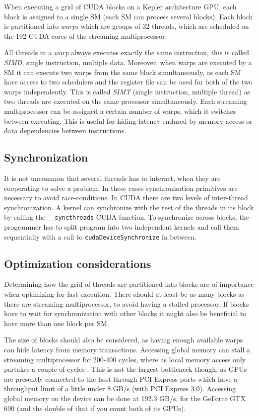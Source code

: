 When executing a grid of CUDA blocks on a Kepler architecture GPU,
each block is assigned to a single SM (each SM can process several
blocks). Each block is partitioned into \textit{warps} which are
groups of 32 threads, which are scheduled on the 192 CUDA cores of the
streaming multiprocessor. %

All threads in a \textit{warp} always executes exactly the same
instruction, this is called \textit{SIMD}, single instruction,
multiple data. Moreover, when warps are executed by a SM it can
execute two warps from the same block simultaneously, as each SM have
access to two schedulers and the register file can be used for both of
the two warps independently. This is called \textit{SIMT} (single
instruction, multiple thread) as two threads are executed on the same
processor simultaneously. Each streaming multiprocessor can be
assigned a certain number of warps, which it switches between
executing. This is useful for hiding latency endured by memory access
or data dependencies between instructions.

\subsection{Synchronization}
It is not uncommon that several threads has to interact, when they are
cooperating to solve a problem. In these cases synchronization
primitives are necessary to avoid race-conditions. In CUDA there are
two levels of inter-thread synchronization. A kernel can synchronize
with the rest of the threads in its block by calling the
\lstinline{__syncthreads} CUDA function. To synchronize across blocks,
the programmer has to split program into two independent kernels and
call them sequentially with a call to \lstinline{cudaDeviceSynchronize}
in between.

\subsection{Optimization considerations}
Determining how the grid of threads are partitioned into blocks are of
importance when optimizing for fast execution. There should at least
be as many blocks as there are streaming multiprocessor, to avoid
having a stalled processor. If blocks have to wait for synchronization
with other blocks it might also be beneficial to have more than one
block per SM.

The size of blocks should also be considered, as having enough
available warps can hide latency from memory transactions. Accessing
global memory can stall a streaming multiprocessor for 200-400 cycles,
where as local memory access only partakes a couple of cycles
\cite{nvidia2012cudaguide}. This is not the largest bottleneck though,
as GPUs are presently connected to the host through PCI Express ports
which have a throughput limit of a little under 8 GB/s (with PCI
Express 3.0). Accessing global memory on the device can be done at
192.3 GB/s, for the GeForce GTX 690 (and the double of that if you
count both of its GPUs).


